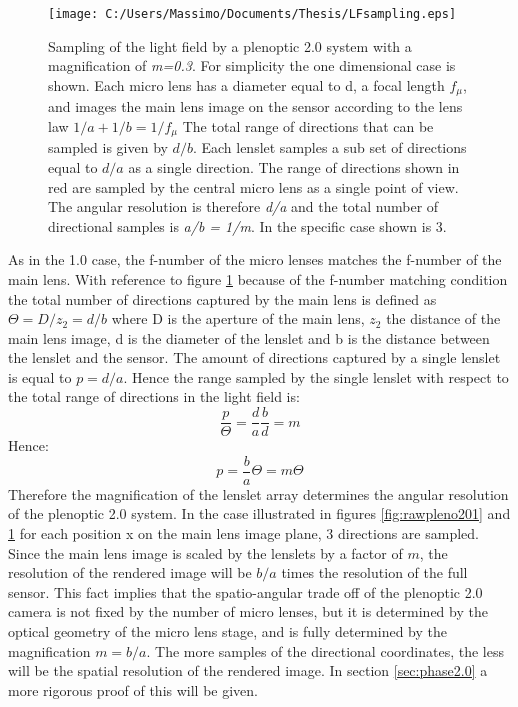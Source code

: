   \begin{figure}[H]
  	\centering
  	\texttt{[image: C:/Users/Massimo/Documents/Thesis/LFsampling.eps]}
  	\caption{\label{fig:rawpleno202}Sampling of the light field by a plenoptic 2.0 system with a magnification of \textit{m=0.3}. For simplicity the one dimensional case is shown. Each micro lens has a diameter equal to d, a focal length $f_{\mu}$, and images the main lens image on the sensor according to the lens law $1/a+1/b=1/f_{\mu}$ The total range of directions that can be sampled is given by $d/b$. Each lenslet samples a sub set of directions equal to $d/a$ as a single direction. The range of directions shown in red are sampled by the central micro lens as a single point of view. The angular resolution is therefore \textit{d/a} and the total number of directional samples is \textit{a/b = 1/m}. In the specific case shown is 3. }
  \end{figure}
  As in the 1.0 case, the f-number of the micro lenses matches the f-number of the main lens.
 With reference to figure \ref{fig:rawpleno202} because of the f-number matching condition the total number of directions captured by the main lens is defined as $\Theta=D/z_2=d/b$ where D is the aperture of the main lens, $z_2$ the distance of the main lens image, d is the diameter of the lenslet and b is the distance between the lenslet and the sensor. The amount of directions captured by a single lenslet is equal to $p=d/a$. Hence the range sampled by the single lenslet with respect to the total range of directions in the light field is:
 \begin{equation}
 \label{eq:magnification}
 \dfrac{p}{\Theta}=\dfrac{d}{a}\dfrac{b}{d}=m
 \end{equation} 
 Hence:
  \begin{equation}
  \label{eq:magnification2}
  p=\dfrac{b}{a}\Theta=m\Theta
  \end{equation}
  Therefore the magnification of the lenslet array determines the angular resolution of the plenoptic 2.0 system. In the case illustrated in figures \ref{fig:rawpleno201} and \ref{fig:rawpleno202} for each position x on the main lens image plane, 3 directions are sampled. Since the main lens image is scaled by the lenslets by a factor of $m$, the resolution of the rendered image will be $b/a$ times the resolution of the full sensor. This fact implies that the spatio-angular trade off of the plenoptic 2.0 camera is not fixed by the number of micro lenses, but it is determined by the optical geometry of the micro lens stage, and is fully determined by the magnification $m=b/a$. The more samples of the directional coordinates, the less will be the spatial resolution of the rendered image. In section \ref{sec:phase2.0} a more rigorous proof of this will be given.
